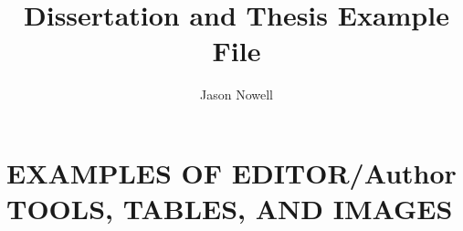 \documentclass[editMode]{ufdissertation}\sloppy
\title{Dissertation and Thesis Example File}%
\author{Jason Nowell}%
\begin{document}






\chapter{EXAMPLES OF EDITOR/Author TOOLS, TABLES, AND IMAGES}%

\end{document}
